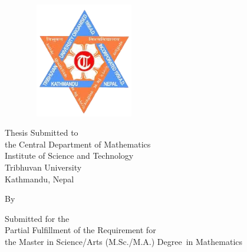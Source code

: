 {\DoubleSpacing \begin{center}
  {\LARGE
    {\bfseries {\thetitle}}} \\

  \vspace{1.5cm}

\begin{figure}[h]
	\centering
	\includegraphics[height=5cm,width=5cm]{pictures/tulogo.png}
\end{figure}

\vspace{2cm}

	Thesis Submitted to\\ the
	Central Department of Mathematics\\
	Institute of Science and Technology\\
	Tribhuvan University \\
	Kathmandu, Nepal\\

\vspace{1.5cm}

	By\\
	{\bfseries  \theauthor}

\vspace{1.5cm}

Submitted for the\\
Partial Fulfillment of the Requirement for\\
the Master in Science/Arts (M.Sc./M.A.)  Degree\
in Mathematics\\

\vspace{1cm}

{\thedate}

\thispagestyle{empty}
\end{center}}


\clearpage